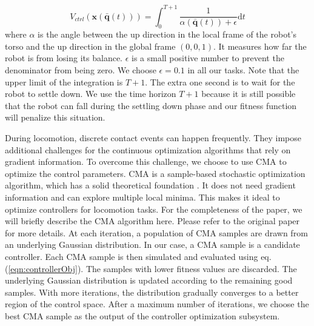 \begin{equation}
  V_{ctrl}(\mathbf{x}(\bar{\mathbf{q}}(t)))=\int_0^{T+1} \frac{1}{\alpha(\bar{\mathbf{q}}(t))+\epsilon}\mathrm{d}t
  \label{eqn:controllerObj}
\end{equation}
where $\alpha$ is the angle between the up direction in the local frame of the robot's torso and the up direction in the global frame $(0,0,1)$. It measures how far the robot is from losing its balance. $\epsilon$ is a small positive number to prevent the denominator from being zero. We choose $\epsilon=0.1$ in all our tasks. Note that the upper limit of the integration is $T+1$. The extra one second is to wait for the robot to settle down. We use the time horizon $T+1$ because it is still possible that the robot can fall during the settling down phase and our fitness function will penalize this situation.

During locomotion, discrete contact events can happen frequently. They impose additional challenges for the continuous optimization algorithms that rely on gradient information. To overcome this challenge, we choose to use CMA to optimize the control parameters. CMA is a sample-based stochastic optimization algorithm, which has a solid theoretical foundation \cite{akimoto:2010,glasmachers:2010}. It does not need gradient information and can explore multiple local minima. This makes it ideal to optimize controllers for locomotion tasks. For the completeness of the paper, we will briefly describe the CMA algorithm here. Please refer to the original paper \cite{Hansen:2009} for more details. At each iteration, a population of CMA samples are drawn from an underlying Gaussian distribution. In our case, a CMA sample is a candidate controller. Each CMA sample is then simulated and evaluated using eq.(\ref{eqn:controllerObj}). The samples with lower fitness values are discarded. The underlying Gaussian distribution is updated according to the remaining good samples. With more iterations, the distribution gradually converges to a better region of the control space. After a maximum number of iterations, we choose the best CMA sample as the output of the controller optimization subsystem.
